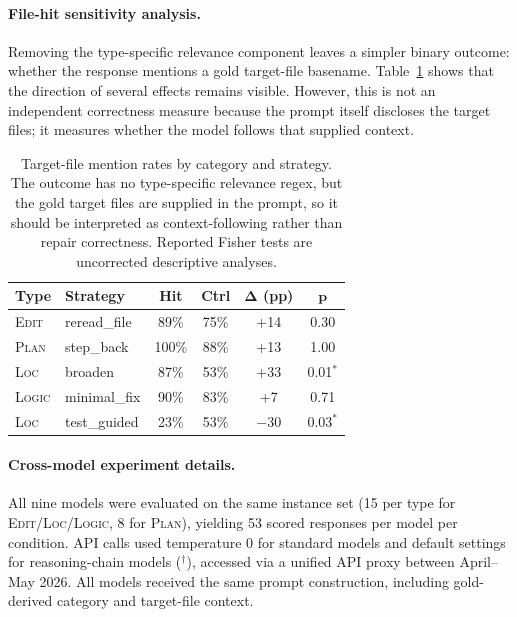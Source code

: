 \documentclass{article}
\begin{document}
\paragraph{File-hit sensitivity analysis.}
Removing the type-specific relevance component leaves a simpler binary outcome:
whether the response mentions a gold target-file basename.  Table~\ref{tab:filehit-robustness}
shows that the direction of several effects remains visible.  However, this is
not an independent correctness measure because the prompt itself discloses the
target files; it measures whether the model follows that supplied context.

\begin{table}[H]
\centering
\small
\begin{tabular}{@{}llcccc@{}}
\toprule
\textbf{Type} & \textbf{Strategy} & \textbf{Hit} & \textbf{Ctrl} & $\boldsymbol{\Delta}$ \textbf{(pp)} & $\boldsymbol{p}$ \\
\midrule
\textsc{Edit} & reread\_file & 89\% & 75\% & +14 & 0.30 \\
\textsc{Plan} & step\_back & 100\% & 88\% & +13 & 1.00 \\
\textsc{Loc} & broaden & 87\% & 53\% & +33 & 0.01$^*$ \\
\textsc{Logic} & minimal\_fix & 90\% & 83\% & +7 & 0.71 \\
\midrule
\textsc{Loc} & test\_guided & 23\% & 53\% & $-$30 & 0.03$^*$ \\
\bottomrule
\end{tabular}
\caption{Target-file mention rates by category and strategy.  The outcome has no
type-specific relevance regex, but the gold target files are supplied in the
prompt, so it should be interpreted as context-following rather than repair
correctness.  Reported Fisher tests are uncorrected descriptive analyses.}
\label{tab:filehit-robustness}
\end{table}

\paragraph{Cross-model experiment details.}
All nine models were evaluated on the same instance set (15 per type for \textsc{Edit}/\textsc{Loc}/\textsc{Logic}, 8 for \textsc{Plan}), yielding 53 scored responses per model per condition.
API calls used temperature 0 for standard models and default settings for reasoning-chain models ($^\dagger$), accessed via a unified API proxy between April--May 2026.
All models received the same prompt construction, including gold-derived
category and target-file context.
\end{document}
